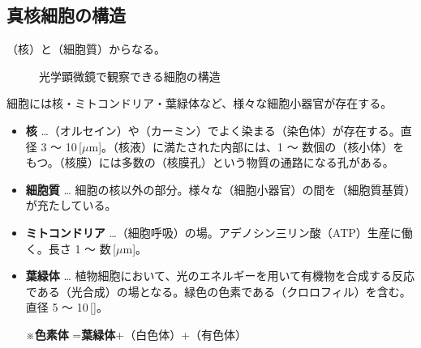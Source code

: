 \subsection{真核細胞の構造}
（\textcolor{black!10}{核}）と（\textcolor{black!10}{細胞質}）からなる。
\vspc{-5.00pt}\begin{figure}[H]\centering{}\caption{光学顕微鏡で観察できる細胞の構造}\label{光学顕微鏡で観察できる細胞の構造}\end{figure}
細胞には核・ミトコンドリア・葉緑体など、様々な細胞小器官が存在する。
\begin{itemize}\setlength{\leftskip}{-1.00zw}%
\item[\ajMaru{1}] \textbf{核} …（\textcolor{black!10}{オルセイン}）や（\textcolor{black!10}{カーミン}）でよく染まる（\textcolor{black!10}{染色体}）が存在する。直径 3 ～ 10\,[$\mu\text{m}$]。（\textcolor{black!10}{核液}）に満たされた内部には、1 ～ 数個の（\textcolor{black!10}{核小体}）をもつ。（\textcolor{black!10}{核膜}）には多数の（\textcolor{black!10}{核膜孔}）という物質の通路になる孔がある。
\item[\ajMaru{2}] \textbf{細胞質} … 細胞の核以外の部分。様々な（\textcolor{black!10}{細胞小器官}）の間を（\textcolor{black!10}{細胞質基質}）が充たしている。
\item[\ajMaru{3}] \textbf{ミトコンドリア} …（\textcolor{black!10}{細胞呼吸}）の場。アデノシン三リン酸（ATP）生産に働く。長さ 1 ～ 数\,[$\mu\text{m}$]。
\item[\ajMaru{4}] \textbf{葉緑体} … 植物細胞において、光のエネルギーを用いて有機物を合成する反応である（\textcolor{black!10}{光合成}）の場となる。緑色の色素である（\textcolor{black!10}{クロロフィル}）を含む。直径 5 ～ 10\,[]。\begin{center}※\textbf{色素体} =\textbf{葉緑体}+（\textcolor{black!10}{白色体}）+（\textcolor{black!10}{有色体}）\end{center}
\end{itemize}
